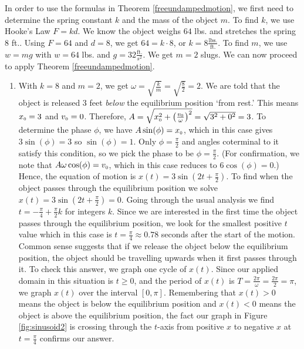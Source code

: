 {In order to use the formulas in Theorem \ref{freeundampedmotion}, we first need to determine the spring constant $k$ and the mass of the object $m$.  To find $k$, we use Hooke's Law $F = kd$.  We know the object weighs $64$ lbs. and stretches the spring $8$ ft.. Using $F = 64$ and $d = 8$,  we get  $64  = k \cdot 8 $, or  $k = 8 \frac{\text{lbs.}}{\text{ft.}}$.  To find $m$, we use $w = mg$ with $w = 64$ lbs. and $g =32 \frac{\text{ft.}}{s^2}$.  We get $m = 2$ slugs.  We can now proceed to apply Theorem \ref{freeundampedmotion}.

\begin{enumerate}

\item  With $k = 8$ and $m = 2$, we get $\omega = \sqrt{\frac{k}{m}} = \sqrt{\frac{8}{2}} = 2$. We are told that the object is released 3 feet \textit{below} the equilibrium position `from rest.'  This means  $x_{\text{\tiny $0$}} = 3$ and  $v_{\text{\tiny $0$}} = 0$.  Therefore, $A = \sqrt{x_{\text{\tiny $0$}}^2 + \left( \frac{v_{\text{\tiny $0$}}}{\omega}\right)^2} = \sqrt{3^2 + 0^2} = 3$.  To determine the phase $\phi$, we have $A\sin(\phi) = x_{\text{\tiny $0$}}$, which in this case gives $3 \sin(\phi) = 3$ so $\sin(\phi) = 1$.  Only $\phi = \frac{\pi}{2}$ and angles coterminal to it satisfy this condition, so we pick the phase to be $\phi = \frac{\pi}{2}$. (For confirmation, we note that $A\omega\cos(\phi) = v_{\text{\tiny $0$}}$, which in this case reduces to $6\cos(\phi) = 0$.) Hence, the equation of motion is $x(t) = 3\sin\left(2t + \frac{\pi}{2}\right)$.  To find when the object passes through the equilibrium position we solve $x(t)= 3\sin\left(2t + \frac{\pi}{2}\right) = 0$. Going through the usual analysis we find $t = -\frac{\pi}{4} + \frac{\pi}{2} k$ for integers $k$. Since we are interested in the first time the object passes through the equilibrium position, we look for the smallest positive $t$ value which in this case is $t = \frac{\pi}{4} \approx 0.78$ seconds after the  start of the motion.  Common sense suggests that if we release the object below the equilibrium position, the object should be travelling upwards when it first passes through it.  To check this answer, we graph one cycle of  $x(t)$.  Since our applied domain in this situation is $t \geq 0$, and the period of $x(t)$ is $T = \frac{2\pi}{\omega} = \frac{2\pi}{2} = \pi$, we graph $x(t)$ over the interval $[0,\pi]$.  Remembering that $x(t) > 0$ means the object is below the equilibrium position and $x(t) < 0$ means the object is above the equilibrium position, the fact our graph in Figure \ref{fig:sinusoid2} is crossing through the $t$-axis from positive $x$ to negative $x$ at $t = \frac{\pi}{4}$ confirms our answer.


\end{enumerate}}
